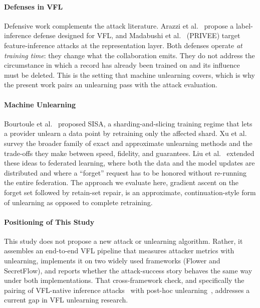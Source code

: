 \documentclass[sigconf,anonymous]{acmart}
\begin{document}
\paragraph{Defenses in VFL}
Defensive work complements the attack literature. Arazzi et al.~\cite{arazzi2025defense} propose a label-inference defense designed for VFL, and Madabushi et al.~\cite{madabushi2025privee} (PRIVEE) target feature-inference attacks at the representation layer. Both defenses operate \emph{at training time}: they change what the collaboration emits. They do not address the circumstance in which a record has already been trained on and its influence must be deleted. This is the setting that machine unlearning covers, which is why the present work pairs an unlearning pass with the attack evaluation.

\paragraph{Machine Unlearning}
Bourtoule et al.~\cite{bourtoule2021sisa} proposed SISA, a sharding-and-slicing training regime that lets a provider unlearn a data point by retraining only the affected shard. Xu et al.~\cite{xu2023survey} survey the broader family of exact and approximate unlearning methods and the trade-offs they make between speed, fidelity, and guarantees. Liu et al.~\cite{liu2021federated} extended these ideas to federated learning, where both the data and the model updates are distributed and where a ``forget'' request has to be honored without re-running the entire federation. The approach we evaluate here, gradient ascent on the forget set followed by retain-set repair, is an approximate, continuation-style form of unlearning as opposed to complete retraining.

\paragraph{Positioning of This Study}
This study does not propose a new attack or unlearning algorithm. Rather, it assembles an end-to-end VFL pipeline that measures attacker metrics with unlearning, implements it on two widely used frameworks (Flower and SecretFlow), and reports whether the attack-success story behaves the same way under both implementations. That cross-framework check, and specifically the pairing of VFL-native inference attacks~\cite{fu2022label,bai2025provfl,yao2025urvfl,liu2025pgac} with post-hoc unlearning~\cite{bourtoule2021sisa,liu2021federated}, addresses a current gap in VFL unlearning research.
\end{document}
